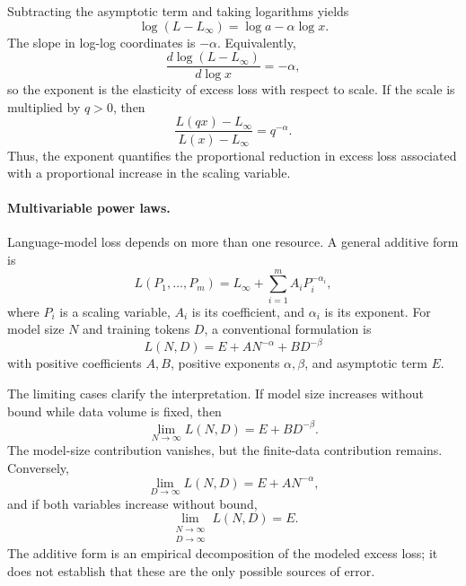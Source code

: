 Subtracting the asymptotic term and taking logarithms yields
\begin{equation}
    \log(L-L_{\infty})
    =
    \log a-\alpha\log x.
    \label{eq:scaling-log-linear}
\end{equation}
The slope in log-log coordinates is \(-\alpha\). Equivalently,
\[
    \frac{d\log(L-L_{\infty})}{d\log x}=-\alpha,
\]
so the exponent is the elasticity of excess loss with respect to scale. If
the scale is multiplied by \(q>0\), then
\begin{equation}
    \frac{L(qx)-L_{\infty}}{L(x)-L_{\infty}}
    =
    q^{-\alpha}.
    \label{eq:scaling-power-ratio}
\end{equation}
Thus, the exponent quantifies the proportional reduction in excess loss
associated with a proportional increase in the scaling variable.

\paragraph{Multivariable power laws.}
Language-model loss depends on more than one resource. A general additive
form is
\begin{equation}
    L(P_1,\ldots,P_m)
    =
    L_{\infty}
    +
    \sum_{i=1}^{m}A_iP_i^{-\alpha_i},
    \label{eq:scaling-general-additive}
\end{equation}
where \(P_i\) is a scaling variable, \(A_i\) is its coefficient, and
\(\alpha_i\) is its exponent. For model size \(N\) and training tokens \(D\),
a conventional formulation is
\begin{equation}
    \boxed{
    L(N,D)
    =
    E+AN^{-\alpha}+BD^{-\beta}
    }
    \label{eq:scaling-additive-nd}
\end{equation}
with positive coefficients \(A,B\), positive exponents \(\alpha,\beta\),
and asymptotic term \(E\).

The limiting cases clarify the interpretation. If model size increases
without bound while data volume is fixed, then
\begin{equation}
    \lim_{N\rightarrow\infty}L(N,D)
    =
    E+BD^{-\beta}.
    \label{eq:scaling-limit-model}
\end{equation}
The model-size contribution vanishes, but the finite-data contribution
remains. Conversely,
\begin{equation}
    \lim_{D\rightarrow\infty}L(N,D)
    =
    E+AN^{-\alpha},
    \label{eq:scaling-limit-data}
\end{equation}
and if both variables increase without bound,
\begin{equation}
    \lim_{\substack{N\rightarrow\infty\\D\rightarrow\infty}}
    L(N,D)=E.
    \label{eq:scaling-joint-limit}
\end{equation}
The additive form is an empirical decomposition of the modeled excess loss;
it does not establish that these are the only possible sources of error.

